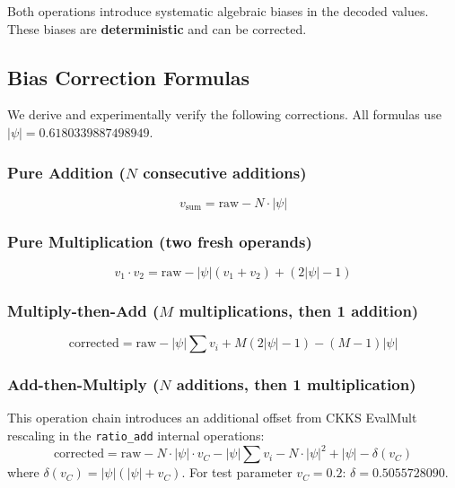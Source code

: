 \documentclass[11pt,a4paper]{article}
\begin{document}
Both operations introduce systematic algebraic biases in the decoded values. These biases are \textbf{deterministic} and can be corrected.

\subsection{Bias Correction Formulas}

We derive and experimentally verify the following corrections. All formulas use $|\psi| = 0.6180339887498949$.

\subsubsection{Pure Addition ($N$ consecutive additions)}

\begin{equation}
v_{\text{sum}} = \text{raw} - N \cdot |\psi|
\end{equation}

\subsubsection{Pure Multiplication (two fresh operands)}

\begin{equation}
v_1 \cdot v_2 = \text{raw} - |\psi|(v_1 + v_2) + (2|\psi| - 1)
\end{equation}

\subsubsection{Multiply-then-Add ($M$ multiplications, then 1 addition)}

\begin{equation}
\text{corrected} = \text{raw} - |\psi|\sum v_i + M(2|\psi|-1) - (M-1)|\psi|
\end{equation}

\subsubsection{Add-then-Multiply ($N$ additions, then 1 multiplication)}

This operation chain introduces an additional offset from CKKS EvalMult rescaling in the \texttt{ratio\_add} internal operations:
\begin{equation}
\text{corrected} = \text{raw} - N\!\cdot\!|\psi|\!\cdot\!v_C - |\psi|\sum v_i - N\!\cdot\!|\psi|^2 + |\psi| - \delta(v_C)
\end{equation}
where $\delta(v_C) = |\psi|(|\psi| + v_C)$. For test parameter $v_C = 0.2$: $\delta = 0.5055728090$.
\end{document}
